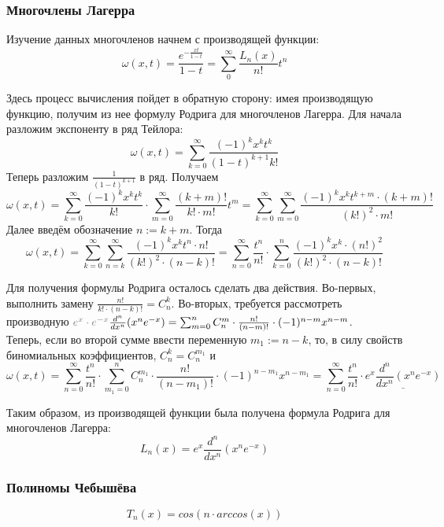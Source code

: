 	\subsubsection{Многочлены Лагерра}
	
	Изучение данных многочленов начнем с производящей функции:
	$$ \omega(x,t) = \frac{e^{-\frac{xt}{1-t}}}{1 - t} = \sum_0^{\infty} \frac{L_n(x)}{n!} t^n$$
	
	Здесь процесс вычисления пойдет в обратную сторону: имея производящую функцию, получим из нее формулу Родрига для
	многочленов Лагерра. Для начала разложим экспоненту в ряд Тейлора:
	$$ \omega(x,t) = \sum_{k=0}^{\infty} \frac{(-1)^k x^k t^k}{(1-t)^{k+1} k!}$$
	Теперь разложим $\frac{1}{(1-t)^{k+1}}$ в ряд. Получаем
	$$ \omega(x,t) = \sum_{k=0}^{\infty} \frac{(-1)^k x^k t^k}{k!} \cdot \sum_{m=0}^{\infty} \frac{(k+m)!}{k! \cdot m!} t^m
	 = \sum_{k=0}^{\infty} \sum_{m=0}^{\infty} \frac{(-1)^k x^k t^{k+m} \cdot (k+m)!}{(k!)^2 \cdot m!} $$
	Далее введём обозначение $n := k+m$. Тогда
	$$ \omega(x,t) = \sum_{k=0}^{\infty} \sum_{n=k}^{\infty} \frac{(-1)^k x^k t^n \cdot n!}{(k!)^2 \cdot (n-k)!}
	 = \sum_{n=0}^{\infty} \frac{t^n}{n!} \cdot \sum_{k=0}^{n} \frac{(-1)^k x^k \cdot (n!)^2}{(k!)^2 \cdot (n-k)!}$$
	 
	Для получения формулы Родрига осталось сделать два действия. Во-первых, выполнить замену $\frac{n!}{k! \cdot (n-k)!} = C_n^k$.
	Во-вторых, требуется рассмотреть производную ${\color{gray}e^x \cdot e^{-x}} \frac{d^n}{dx^n}(x^n e^{-x}) 
	= \sum_{m=0}^n C_n^m \cdot \frac{n!}{(n-m)!} \cdot (-1)^{n-m} x^{n-m}$. \\
	Теперь, если во второй сумме ввести переменную $m_1 := n - k$, то, в силу свойств биномиальных коэффициентов, $C_n^k = C_n^{m_1}$ и
	$$\omega(x,t) = \sum_{n=0}^{\infty} \frac{t^n}{n!} \cdot \sum_{m_1=0}^{n} C_n^{m_1} \cdot \frac{n!}{(n-m_1)!}
	\cdot (-1)^{n-m_1} x^{n-m_1} = \sum_{n=0}^{\infty} \frac{t^n}{n!} \cdot \underline{e^x \frac{d^n}{dx^n}(x^n e^{-x})}$$
	
	Таким образом, из производящей функции была получена формула Родрига для многочленов Лагерра:
	$$L_n(x) = e^x \frac{d^n}{dx^n}(x^n e^{-x})$$
	
	\subsubsection{Полиномы Чебышёва}
	$$T_n(x) = cos(n \cdot arccos(x))$$

